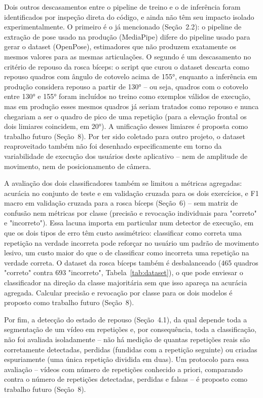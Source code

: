 \documentclass[12pt]{article}
\begin{document}
Dois outros descasamentos entre o pipeline de treino e o de inferência
foram identificados por inspeção direta do código, e ainda não têm seu
impacto isolado experimentalmente. O primeiro é o já mencionado
(Seção~2.2): o pipeline de extração de pose usado na produção (MediaPipe)
difere do pipeline usado para gerar o dataset (OpenPose), estimadores que
não produzem exatamente os mesmos valores para as mesmas articulações. O
segundo é um descasamento no critério de repouso da rosca bíceps: o script
que curou o dataset descarta como repouso quadros com ângulo de cotovelo
acima de 155°, enquanto a inferência em produção considera repouso a
partir de 130° -- ou seja, quadros com o cotovelo entre 130° e 155° foram
incluídos no treino como exemplos válidos de execução, mas em produção
esses mesmos quadros já seriam tratados como repouso e nunca chegariam a
ser o quadro de pico de uma repetição (para a elevação frontal os dois
limiares coincidem, em 20°). A unificação desses limiares é proposta como
trabalho futuro (Seção~8). Por ter sido coletado para outro projeto, o
dataset reaproveitado também não foi desenhado especificamente em torno da
variabilidade de execução dos usuários deste aplicativo -- nem de
amplitude de movimento, nem de posicionamento de câmera.

A avaliação dos dois classificadores também se limitou a métricas
agregadas: acurácia no conjunto de teste e em validação cruzada para os
dois exercícios, e F1 macro em validação cruzada para a rosca bíceps
(Seção~6) -- sem matriz de confusão nem métricas por classe (precisão e
revocação individuais para "correto" e "incorreto"). Essa lacuna importa
em particular num detector de execução, em que os dois tipos de erro têm
custo assimétrico: classificar como correta uma repetição na verdade
incorreta pode reforçar no usuário um padrão de movimento lesivo, um custo
maior do que o de classificar como incorreta uma repetição na verdade
correta. O dataset da rosca bíceps também é desbalanceado (465 quadros
"correto" contra 693 "incorreto", Tabela~\ref{tab:dataset}), o que pode
enviesar o classificador na direção da classe majoritária sem que isso
apareça na acurácia agregada. Calcular precisão e revocação por classe
para os dois modelos é proposto como trabalho futuro (Seção~8).

Por fim, a detecção do estado de repouso (Seção~4.1), da qual depende toda
a segmentação de um vídeo em repetições e, por consequência, toda a
classificação, não foi avaliada isoladamente -- não há medição de quantas
repetições reais são corretamente detectadas, perdidas (fundidas com a
repetição seguinte) ou criadas espuriamente (uma única repetição dividida
em duas). Um protocolo para essa avaliação -- vídeos com número de
repetições conhecido a priori, comparando contra o número de repetições
detectadas, perdidas e falsas -- é proposto como trabalho futuro
(Seção~8).
\end{document}
